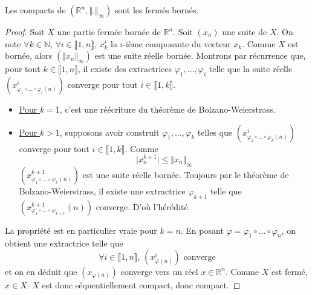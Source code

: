 






  \begin{lemma}
    \label{equivalence-des-normes-en-dimension-finie-et-theoreme-de-riesz-1}
    Les compacts de $(\mathbb{R}^n, \Vert . \Vert_\infty)$ sont les fermés bornés.
  \end{lemma}

  \begin{proof}
    Soit $X$ une partie fermée bornée de $\mathbb{R}^n$. Soit $(x_n)$ une suite de $X$. On note $\forall k \in \mathbb{N}$, $\forall i \in \llbracket 1, n \rrbracket$, $x_k^i$ la $i$-ième composante du vecteur $x_k$. Comme $X$ est bornée, alors $(\Vert x_n \Vert_\infty)$ est une suite réelle bornée. Montrons par récurrence que, pour tout $k \in \llbracket 1, n \rrbracket$, il existe des extractrices $\varphi_1, \dots, \varphi_i$ telle que la suite réelle $(x^i_{\varphi_1 \circ \dots \circ \varphi_i (n)})$ converge pour tout $i \in \llbracket 1, k \rrbracket$.
    \begin{itemize}
      \item \uline{Pour $k = 1$}, c'est une réécriture du théorème de Bolzano-Weierstrass.
      \item \uline{Pour $k > 1$}, supposons avoir construit $\varphi_1, \dots, \varphi_k$ telles que $(x^i_{\varphi_1 \circ \dots \circ \varphi_k (n)})$ converge pour tout $i \in \llbracket 1, k \rrbracket$. Comme
      \[ \vert x^{k+1}_n \vert \leq \Vert x_n \Vert_\infty \]
      $(x^{k+1}_{\varphi_1 \circ \dots \circ \varphi_k (n)})$ est une suite réelle bornée. Toujours par le théorème de Bolzano-Weierstrass, il existe une extractrice $\varphi_{k+1}$ telle que $(x^{k+1}_{\varphi_1 \circ \dots \circ \varphi_{k+1}}(n))$ converge. D'où l'hérédité.
    \end{itemize}
    La propriété est en particulier vraie pour $k = n$. En posant $\varphi = \varphi_1 \circ \dots \circ \varphi_n$, on obtient une extractrice telle que
    \[ \forall i \in \llbracket 1, n \rrbracket, \, (x^i_{\varphi(n)}) \text{ converge} \]
    et on en déduit que $(x_{\varphi(n)})$ converge vers un réel $x \in \mathbb{R}^n$. Comme $X$ est fermé, $x \in X$. $X$ est donc séquentiellement compact, donc compact.
  \end{proof}

